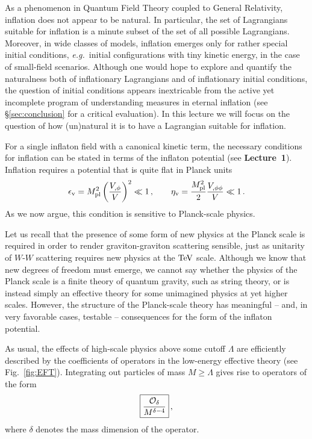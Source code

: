 \documentclass[12pt,letterpaper,rotate]{article}
\def\beq{\begin{equation}}
\def\eeq{\end{equation}}
\def\Mp{M_{\rm pl}}
\begin{document}
{As a phenomenon in Quantum Field Theory coupled to General Relativity, inflation does not appear to be natural. In particular, the set of Lagrangians suitable for inflation is a minute subset of the set of all possible Lagrangians.
Moreover, in wide classes of models, inflation emerges only for rather special initial conditions, {\it e.g.}~initial configurations with tiny kinetic energy, in the case of small-field scenarios.  Although one would hope to explore and quantify the naturalness both of inflationary Lagrangians and of inflationary
 initial conditions, the question of initial conditions appears inextricable from the active yet incomplete program of understanding measures in eternal inflation (see \S\ref{sec:conclusion} for a critical evaluation).
In this lecture we will focus on the question of how (un)natural it is to have a Lagrangian suitable for inflation.

For a single inflaton field with a canonical kinetic term, the necessary conditions for inflation can be stated in terms of the inflaton potential (see {\bf Lecture~1}).
 Inflation requires a potential that is quite flat in Planck units 
 \beq
 \epsilon_{\rm v} = \Mp^2 \left(\frac{V_{,\phi}}{V}  \right)^2 \ll 1\, , \qquad \eta_{\rm v} = \frac{\Mp^2}{2} \frac{V_{, \phi \phi}}{V} \ll 1\, .
 \eeq
As we now argue, this condition is sensitive to Planck-scale physics.  

Let us recall that the presence of some form of new physics at the Planck scale is required in order to render graviton-graviton scattering sensible, just as unitarity of $W$-$W$ scattering requires new physics at the ${\rm TeV}$ scale.  Although we know that new degrees of freedom must emerge, we cannot say whether the physics of the Planck scale is a finite theory of quantum gravity, such as string theory, or is instead simply an effective theory for some unimagined physics at yet higher scales.  However, the structure of the Planck-scale theory has meaningful -- and, in very favorable cases, testable -- consequences for the form of the inflaton potential.

As usual, the effects of high-scale physics above some cutoff $\Lambda$ are efficiently
described by the coefficients of operators in the low-energy effective theory (see Fig.~\ref{fig:EFT}).  Integrating out particles of mass $M \ge \Lambda$ gives rise to operators of the form
\begin{equation}
\label{equ:ODelta}
\fbox{$\displaystyle \frac{{\cal{O}}_{\delta}}{M^{\delta-4}} $}\, ,
\end{equation}
where $\delta$ denotes the mass dimension of the operator.

}
\end{document}
